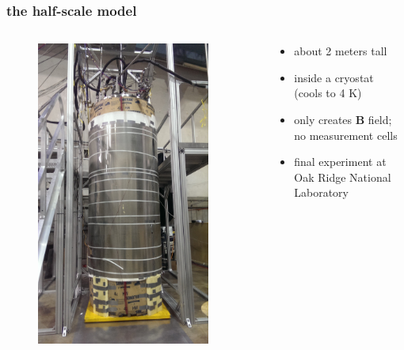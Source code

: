 \documentclass{beamer}
\renewcommand{\vec}{\mathbf}
\begin{document}
\begin{frame}
\frametitle{the half-scale model}

    \begin{columns}
    
    \begin{column}{0.5\textwidth}
    \begin{figure}
    \includegraphics[width=0.9\textwidth]
    {figures/lab_picture.jpg}
    \end{figure}
    \end{column}
    
    \begin{column}{0.5\textwidth}
    \begin{itemize} \pause
        \item about 2 meters tall \pause
        \item inside a cryostat \\(cools to 4 K) \pause
        \item only creates $\vec{B}$ field;\\ no measurement cells \pause
        \item final experiment at Oak Ridge National Laboratory
    \end{itemize}
    \end{column}


\end{columns}
\end{frame}
\end{document}

